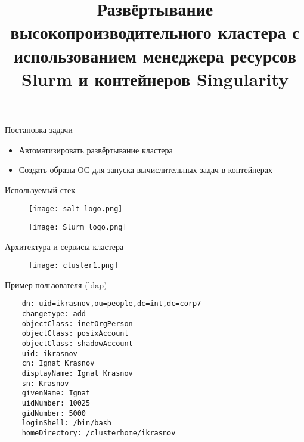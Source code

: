 \documentclass{beamer}
\date{}
\author[]{\texorpdfstring{
\footnotesize 
\begin{minipage}{.5\textwidth}
\centering
Выполнил студент группы \\ 
ИВТ-42-БО \\
Коляда М.М.
\end{minipage}%
\begin{minipage}{.5\textwidth}
\centering
Научный руководитель \\
Доктор физ.-мат наук \\
Глызин C.Д.
\end{minipage}}{}}
\institute{ЯрГУ им. П. Г. Демидова}
\title[развёртывание кластера slurm]{Развёртывание высокопроизводительного кластера с использованием менеджера ресурсов Slurm и контейнеров Singularity}
\begin{document}
\begin{frame}
	\titlepage
\end{frame}

\begin{frame}{Постановка задачи}
	\begin{itemize}[<+->]
	\item Автоматизировать развёртывание кластера
	\item Создать образы ОС для запуска вычислительных задач в контейнерах
	\end{itemize}
\end{frame}

\begin{frame}{Используемый стек}
\begin{figure}
    \flushright
    \texttt{[image: salt-logo.png]}
\end{figure}

\begin{figure}
    \flushleft
    \texttt{[image: Slurm\_logo.png]}
\end{figure}

\begin{figure}
    \centering
    
\end{figure}
    
\end{frame}

\begin{frame}{Архитектура и сервисы кластера}	

\end{frame}

\begin{frame}[plain]
\begin{figure}
    \centering
    \texttt{[image: cluster1.png]}
\end{figure}
\end{frame}

\begin{frame}[fragile]{Пример пользователя (ldap)}
\begin{verbatim}	
	dn: uid=ikrasnov,ou=people,dc=int,dc=corp7
	changetype: add
	objectClass: inetOrgPerson
	objectClass: posixAccount
	objectClass: shadowAccount
	uid: ikrasnov
	cn: Ignat Krasnov
	displayName: Ignat Krasnov
	sn: Krasnov
	givenName: Ignat
	uidNumber: 10025
	gidNumber: 5000
	loginShell: /bin/bash
	homeDirectory: /clusterhome/ikrasnov
\end{verbatim}
\end{frame}
\end{document}
